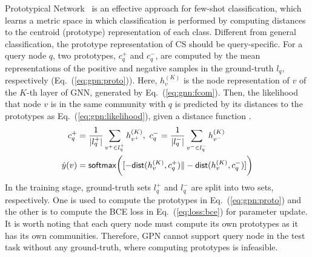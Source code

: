  Prototypical
Network~\cite{prototypical} is an effective approach for few-shot
classification, which learns a metric space in which classification
is performed by computing distances to the centroid (prototype)
representation of each class. Different from general classification,
the prototype representation of CS should be query-specific. For a
query node $q$, two prototypes, $c_q^{+}$ and $c_q^{-}$, are computed
by the mean representations of the positive and negative samples in
the ground-truth $l_q$, respectively (Eq.~(\ref{eq:gpn:proto})).
Here, $h_{v}^{(K)}$ is the node representation of $v$ of the $K$-th
layer of GNN, generated by Eq.~(\ref{eq:gnn:fcom}). Then, the
likelihood that node $v$ is in the same community with $q$ is
predicted by its distances to the prototypes as
Eq.~(\ref{eq:gpn:likelihood}), given a distance function \distance.
%
%
\begin{align}
c_q^{+}  & = \frac{1}{|l_q^{+}|}\sum_{v^{+} \in l_q^{+}} h_{v^{+}}^{(K)},~c_q^{-} = \frac{1}{|l_q^{-}|}\sum_{v^{-} \in l_q^{-}} h_{v^{-}}^{(K)} \label{eq:gpn:proto} \\
\hat{y}(v) & = \mathsf{softmax} \biggl( [-{\mathsf{dist}}(h_{v}^{(K)}, c_q^{+}) \| -{\mathsf{dist}}(h_{v}^{(K)}, c_q^{-}) ] \biggr) \label{eq:gpn:likelihood}
\end {align}
%
In the training stage, ground-truth sets $l_q^{+}$ and $l_q^{-}$ are
split into two sets, respectively. One is used to compute the prototypes
in Eq.~(\ref{eq:gpn:proto}) and the other is to compute the BCE loss
in Eq.~(\ref{eq:loss:bce}) for parameter update.  It is worth
noting that each query node must compute its own prototypes as it has
its own communities.  Therefore, GPN cannot support query node in
the test task without any ground-truth, where computing prototypes is
infeasible.


